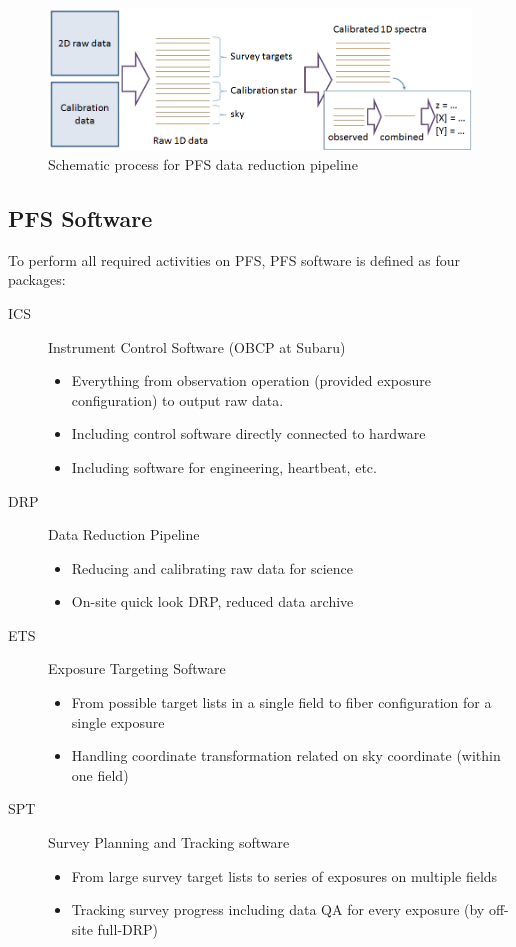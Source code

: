 \documentclass[a4paper,notitlepage]{article}
\begin{document}
\begin{figure}[htb]
  \begin{center}
    \includegraphics[width=.75\linewidth]{sciops-scireq-drp-slide.png}
  \end{center}
  \caption{Schematic process for PFS data reduction pipeline}
  \label{fig:sciops-scireq-drp-slide}
\end{figure}



\subsection{PFS Software}

To perform all required activities on PFS, PFS software is defined as 
four packages: 
\begin{description}
  \item[ICS] Instrument Control Software (OBCP at Subaru)
    \begin{itemize}
      \item Everything from observation operation (provided exposure configuration) to output raw data.
      \item Including control software directly connected to hardware
      \item Including software for engineering, heartbeat, etc.
    \end{itemize}
  \item[DRP] Data Reduction Pipeline
    \begin{itemize}
      \item Reducing and calibrating raw data for science
      \item On-site quick look DRP, reduced data archive
    \end{itemize}
  \item[ETS] Exposure Targeting Software
    \begin{itemize}
      \item From possible target lists in a single field to fiber configuration for a single exposure
      \item Handling coordinate transformation related on sky coordinate (within one field)
    \end{itemize}
  \item[SPT] Survey Planning and Tracking software
    \begin{itemize}
      \item From large survey target lists to series of exposures on multiple fields
      \item Tracking survey progress including data QA for every exposure (by off-site full-DRP)
    \end{itemize}
\end{description}
\end{document}

